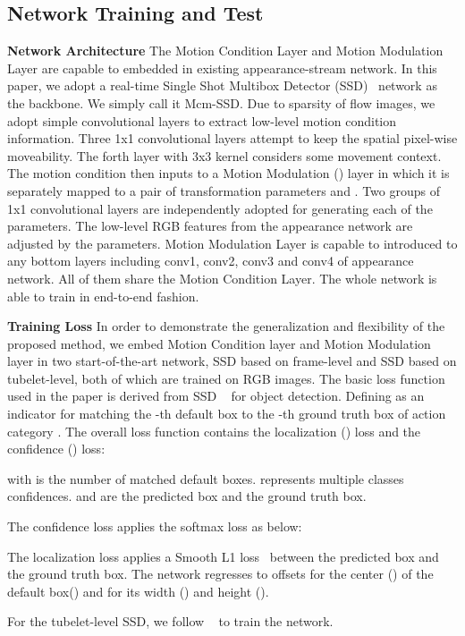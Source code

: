 \documentclass[10pt,twocolumn,letterpaper]{article}
\begin{document}
\subsection{Network Training and Test}
{\bf{Network Architecture}} The Motion Condition Layer and Motion Modulation Layer are capable to embedded in existing appearance-stream network. In this paper, we adopt a real-time Single Shot Multibox Detector (SSD)~\cite{Singh2017, Liu2016} network as the backbone. We simply call it Mcm-SSD. Due to sparsity of flow images, we adopt simple convolutional layers to extract low-level motion condition information. Three 1x1 convolutional layers attempt to keep the spatial pixel-wise moveability. The forth layer with 3x3 kernel considers some movement context. The motion condition then inputs to a Motion Modulation () layer in which it is separately mapped to a pair of transformation parameters  and . Two groups of 1x1 convolutional layers are independently adopted for generating each of the parameters. The low-level RGB features from the appearance network are adjusted by the parameters. Motion Modulation Layer is capable to introduced to any bottom layers including conv1, conv2, conv3 and conv4 of appearance network. All of them share the Motion Condition Layer. The whole network is able to train in end-to-end fashion.

{\bf{Training Loss}} In order to demonstrate the generalization and flexibility of the proposed method, we embed Motion Condition layer and Motion Modulation layer in two start-of-the-art network, SSD based on frame-level and SSD based on tubelet-level, both of which are trained on RGB images. The basic loss function used in the paper is derived from SSD ~\cite{Liu2016} for object detection. Defining  as an indicator for matching the -th default box to the -th ground truth box of action category . The overall loss function contains the localization () loss and the confidence () loss:


with  is the number of matched default boxes.  represents multiple classes confidences.  and  are the predicted box and the ground truth box.

The confidence loss applies the softmax loss as below:

The localization loss applies a Smooth L1 loss~\cite{Girshick2015} between the predicted box and the ground truth box. The network regresses to offsets for the center () of the default box() and for its width () and height ().

For the tubelet-level SSD, we follow ~\cite{Kalogeithon2017} to train the network.
\end{document}
